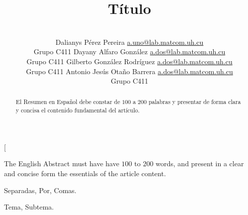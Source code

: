 \documentclass[a4paper,10pt,twocolumn]{article}
\title{Título}
\author{\\
\name Dalianys Pérez Pereira \email \href{mailto:a.uno@lab.matcom.uh.cu}{a.uno@lab.matcom.uh.cu}
	\\ \addr Grupo C411 \AND
\name Dayany Alfaro González \email \href{mailto:a.dos@lab.matcom.uh.cu}{a.dos@lab.matcom.uh.cu}
  \\ \addr Grupo C411 \AND
\name Gilberto González Rodríguez \email \href{mailto:a.dos@lab.matcom.uh.cu}{a.dos@lab.matcom.uh.cu}
\\ \addr Grupo C411 \AND
\name Antonio Jesús Otaño Barrera \email \href{mailto:a.dos@lab.matcom.uh.cu}{a.dos@lab.matcom.uh.cu}
\\ \addr Grupo C411}
\begin{document}
\twocolumn[

\maketitle


\begin{abstract}

	El Resumen en Español debe constar de $100$ a $200$ palabras y presentar de forma
	clara y concisa el contenido fundamental del artículo.

\end{abstract}

\vspace{0.5cm}

\begin{enabstract}

  The English Abstract must have have $100$ to $200$ words, and present in a clear
  and concise form the essentials of the article content.

\end{enabstract}

\begin{keywords}
	Separadas,
	Por,
	Comas.
\end{keywords}

\begin{topics}
	Tema, Subtema.
\end{topics}
\end{document}
